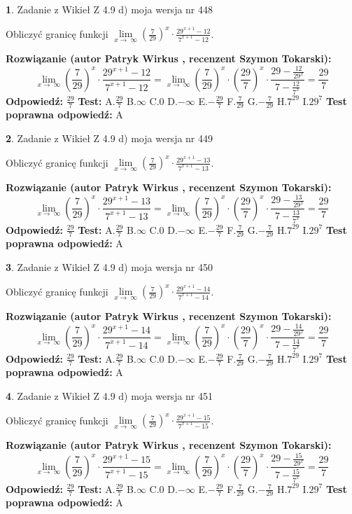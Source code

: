 \documentclass[12pt, a4paper]{article}
\theoremstyle{definition} %
\newtheorem{zad}{}
\newcommand{\zadStart}[1]{\begin{zad}#1\newline}
\newcommand{\zadStop}{\end{zad}}
\newcommand{\rozwStart}[2]{\noindent \textbf{Rozwiązanie (autor #1 , recenzent #2): }\newline}
\newcommand{\rozwStop}{\newline}
\newcommand{\odpStart}{\noindent \textbf{Odpowiedź:}\newline}
\newcommand{\odpStop}{\newline}
\newcommand{\testStart}{\noindent \textbf{Test:}\newline}
\newcommand{\testStop}{\newline}
\newcommand{\kluczStart}{\noindent \textbf{Test poprawna odpowiedź:}\newline}
\newcommand{\kluczStop}{\newline}
\begin{document}
\zadStart{Zadanie z Wikieł Z 4.9 d) moja wersja nr 448}


Obliczyć granicę funkcji  $\lim\limits_{x\to\ \infty}(\frac{7}{29})^{x}\cdot\frac{29^{x+1}-12}{7^{x+1}-12}$.
\zadStop
\rozwStart{Patryk Wirkus}{Szymon Tokarski}
$$\lim\limits_{x\to\ \infty}(\frac{7}{29})^{x}\cdot\frac{29^{x+1}-12}{7^{x+1}-12}=\lim\limits_{x\to\ \infty}(\frac{7}{29})^{x}\cdot(\frac{29}{7})^{x} \cdot \frac{29-\frac{12}{29^{x}}}{7-\frac{12}{7^{x}}} = \frac{29}{7}$$
\rozwStop
\odpStart
$\frac{29}{7}$
\odpStop
\testStart
A.$\frac{29}{7}$ B.$\infty$ C.$0$ D.$-\infty$ E.$-\frac{29}{7}$
F.$\frac{7}{29}$ G.$-\frac{7}{29}$
H.$7^{29}$
I.$29^{7}$
\testStop
\kluczStart
A
\kluczStop



\zadStart{Zadanie z Wikieł Z 4.9 d) moja wersja nr 449}


Obliczyć granicę funkcji  $\lim\limits_{x\to\ \infty}(\frac{7}{29})^{x}\cdot\frac{29^{x+1}-13}{7^{x+1}-13}$.
\zadStop
\rozwStart{Patryk Wirkus}{Szymon Tokarski}
$$\lim\limits_{x\to\ \infty}(\frac{7}{29})^{x}\cdot\frac{29^{x+1}-13}{7^{x+1}-13}=\lim\limits_{x\to\ \infty}(\frac{7}{29})^{x}\cdot(\frac{29}{7})^{x} \cdot \frac{29-\frac{13}{29^{x}}}{7-\frac{13}{7^{x}}} = \frac{29}{7}$$
\rozwStop
\odpStart
$\frac{29}{7}$
\odpStop
\testStart
A.$\frac{29}{7}$ B.$\infty$ C.$0$ D.$-\infty$ E.$-\frac{29}{7}$
F.$\frac{7}{29}$ G.$-\frac{7}{29}$
H.$7^{29}$
I.$29^{7}$
\testStop
\kluczStart
A
\kluczStop



\zadStart{Zadanie z Wikieł Z 4.9 d) moja wersja nr 450}


Obliczyć granicę funkcji  $\lim\limits_{x\to\ \infty}(\frac{7}{29})^{x}\cdot\frac{29^{x+1}-14}{7^{x+1}-14}$.
\zadStop
\rozwStart{Patryk Wirkus}{Szymon Tokarski}
$$\lim\limits_{x\to\ \infty}(\frac{7}{29})^{x}\cdot\frac{29^{x+1}-14}{7^{x+1}-14}=\lim\limits_{x\to\ \infty}(\frac{7}{29})^{x}\cdot(\frac{29}{7})^{x} \cdot \frac{29-\frac{14}{29^{x}}}{7-\frac{14}{7^{x}}} = \frac{29}{7}$$
\rozwStop
\odpStart
$\frac{29}{7}$
\odpStop
\testStart
A.$\frac{29}{7}$ B.$\infty$ C.$0$ D.$-\infty$ E.$-\frac{29}{7}$
F.$\frac{7}{29}$ G.$-\frac{7}{29}$
H.$7^{29}$
I.$29^{7}$
\testStop
\kluczStart
A
\kluczStop



\zadStart{Zadanie z Wikieł Z 4.9 d) moja wersja nr 451}


Obliczyć granicę funkcji  $\lim\limits_{x\to\ \infty}(\frac{7}{29})^{x}\cdot\frac{29^{x+1}-15}{7^{x+1}-15}$.
\zadStop
\rozwStart{Patryk Wirkus}{Szymon Tokarski}
$$\lim\limits_{x\to\ \infty}(\frac{7}{29})^{x}\cdot\frac{29^{x+1}-15}{7^{x+1}-15}=\lim\limits_{x\to\ \infty}(\frac{7}{29})^{x}\cdot(\frac{29}{7})^{x} \cdot \frac{29-\frac{15}{29^{x}}}{7-\frac{15}{7^{x}}} = \frac{29}{7}$$
\rozwStop
\odpStart
$\frac{29}{7}$
\odpStop
\testStart
A.$\frac{29}{7}$ B.$\infty$ C.$0$ D.$-\infty$ E.$-\frac{29}{7}$
F.$\frac{7}{29}$ G.$-\frac{7}{29}$
H.$7^{29}$
I.$29^{7}$
\testStop
\kluczStart
A
\kluczStop
\end{document}
